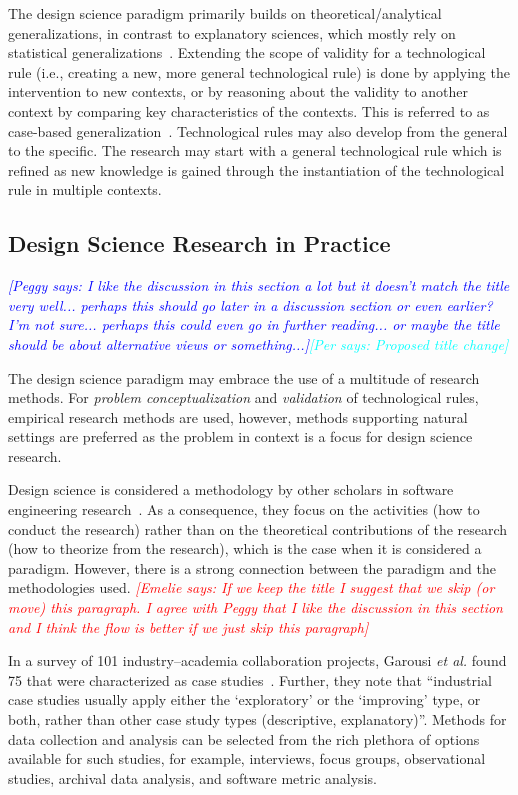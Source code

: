 \documentclass[graybox]{svmult}
\newcommand{\emelie}[1]{\textcolor{red}{{\it [Emelie says: #1]}}}
\newcommand{\peggy}[1]{\textcolor{blue}{{\it [Peggy says: #1]}}}
\newcommand{\per}[1]{\textcolor{cyan}{{\it [Per says: #1]}}}
\newcommand{\emelie}[1]{}
\newcommand{\peggy}[1]{}
\newcommand{\per}[1]{}
\begin{document}
The design science paradigm primarily builds on theoretical/analytical generalizations, in contrast to explanatory sciences, which mostly rely on statistical generalizations~\cite{Runeson12Case}. Extending the scope of validity for a technological rule (i.e., creating a new, more general technological rule) is done by applying the intervention to new contexts, or by reasoning about the validity to another context by comparing key characteristics of the contexts. This is referred to as case-based generalization~\cite{wieringa_six_2015}.  
Technological rules may also develop from the general to the specific. The research may start with a general technological rule which is refined as new knowledge is gained through the instantiation of the technological rule in multiple contexts. 


\subsection{Design Science Research in Practice} 
\peggy{I like the discussion in this section a lot but it doesn't match the title very well...  perhaps this should go later in a discussion section or even earlier? I'm not sure... perhaps this could even go in further reading... or maybe the title should be about alternative views or something...}\per{Proposed title change}

The design science paradigm may embrace the use of a multitude of research methods. For \emph{problem conceptualization} and \emph{validation} of technological rules, empirical research methods are used, however, methods supporting natural settings are preferred as the problem in context is a focus for design science research. 

Design science is considered a methodology by other scholars in software engineering research~\cite{Wohlin2015}. As a consequence, they focus on the %
activities (how to conduct the research) rather than on the theoretical contributions of the research (how to theorize from the research), which is the case when it is considered a paradigm. However, %
there is a strong connection between the paradigm and the methodologies used.%
\emelie{If we keep the title I suggest that we skip (or move) this paragraph. I agree with Peggy that I like the discussion in this section and I think the flow is better if we just skip this paragraph}

In a survey of 101 industry--academia collaboration projects, Garousi \emph{et al.} found 75 that were characterized as case studies~\cite{Garousi2019}. Further, they note that ``industrial case studies usually apply either the `exploratory' or the `improving' type, or both, rather than other case study types (descriptive, explanatory)''. Methods for data collection and analysis can be selected from the rich plethora of options available for such studies, for example, interviews, focus groups, observational studies, archival data analysis, and software metric analysis. 
\end{document}

